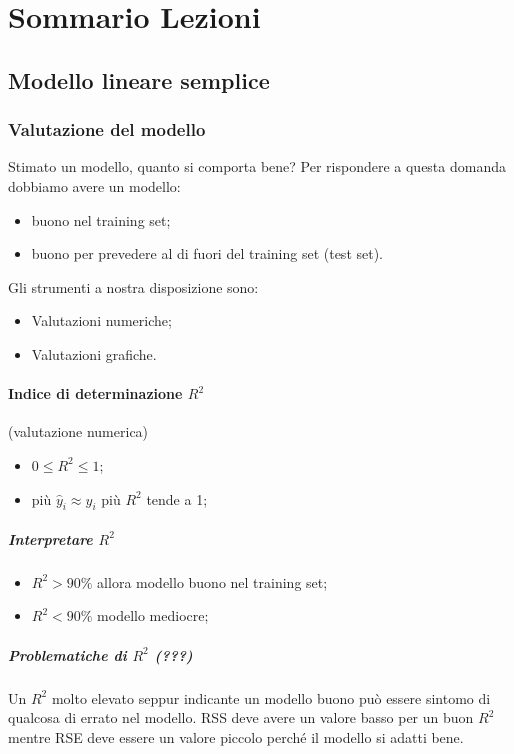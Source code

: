 \documentclass[a4paper]{article}
\begin{document}
	
	\section{Sommario Lezioni}
	
		\subsection{Modello lineare semplice}
		
			\subsubsection{Valutazione del modello}
				Stimato un modello, quanto si comporta bene? Per rispondere a questa domanda dobbiamo avere un modello:
				\begin{itemize}
					\item buono nel training set;
					\item buono per prevedere al di fuori del training set (test set).
				\end{itemize}
				
				Gli strumenti a nostra disposizione sono:
				\begin{itemize}
					\item Valutazioni numeriche;
					\item Valutazioni grafiche.
				\end{itemize}
				
				\paragraph{Indice di determinazione $R^2$} (valutazione numerica)
				\begin{itemize}
					\item $0 \leq R^2 \leq 1$;
					\item più $\hat{y}_i \approx y_i$ più $R^2$ tende a 1;
				\end{itemize}
				
				\subparagraph{Interpretare $R^2$}
				\begin{itemize}
					\item $R^2 > 90\%$ allora modello buono nel training set;
					\item $R^2 < 90\%$ modello mediocre;
				\end{itemize}
				
				\subparagraph{Problematiche di $R^2$ (???)}
				 Un $R^2$ molto elevato seppur indicante un modello buono può essere sintomo di qualcosa di errato nel modello. RSS deve avere un valore basso per un buon $R^2$ mentre RSE deve essere un valore piccolo perché il modello si adatti bene.
				 
\end{document}
